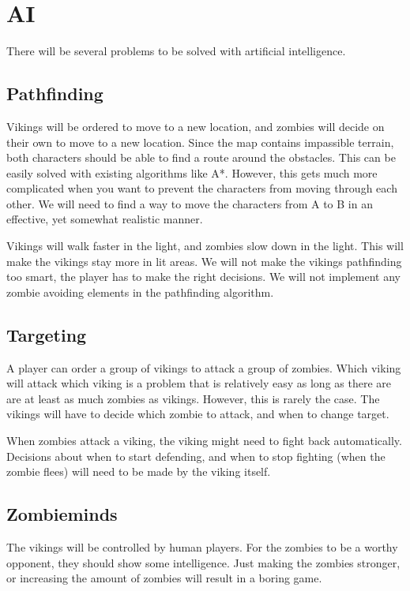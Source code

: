 \chapter{AI}

There will be several problems to be solved with artificial intelligence.

\section{Pathfinding}

Vikings will be ordered to move to a new location, and zombies will decide on their own to move to a new location. Since the map contains impassible terrain, both characters should be able to find a route around the obstacles. This can be easily solved with existing algorithms like A*. However, this gets much more complicated when you want to prevent the characters from moving through each other. We will need to find a way to move the characters from A to B in an effective, yet somewhat realistic manner.

Vikings will walk faster in the light, and zombies slow down in the light. This will make the vikings stay more in lit areas. We will not make the vikings pathfinding too smart, the player has to make the right decisions. We will not implement any zombie avoiding elements in the pathfinding algorithm.

\section{Targeting}

A player can order a group of vikings to attack a group of zombies. Which viking will attack which viking is a problem that is relatively easy as long as there are are at least as much zombies as vikings. However, this is rarely the case. The vikings will have to decide which zombie to attack, and when to change target.

When zombies attack a viking, the viking might need to fight back automatically. Decisions about when to start defending, and when to stop fighting (when the zombie flees) will need to be made by the viking itself.

\section{Zombieminds}

The vikings will be controlled by human players. For the zombies to be a worthy opponent, they should show some intelligence. Just making the zombies stronger, or increasing the amount of zombies will result in a boring game.

